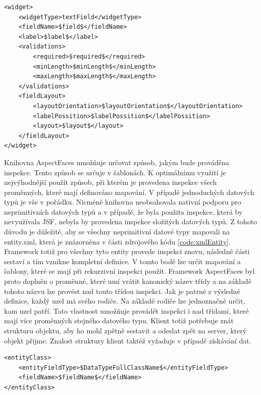 \begin{lstlisting}[caption=Ukázka definice komponenty,
label={code:xmlInputField}, basicstyle=\footnotesize]
<widget>
	<widgetType>textField</widgetType>
	<fieldName>$field$</fieldName>
	<label>$label$</label>
	<validations>
		<required>$required$</required>
		<minLength>$minLength$</minLength>
		<maxLength>$maxLength$</maxLength>
	</validations>
	<fieldLayout>
		<layoutOrientation>$layoutOrientation$</layoutOrientation>
		<labelPossition>$labelPossition$</labelPossition>
		<layout>$layout$</layout>
	</fieldLayout>
</widget>
\end{lstlisting}
Knihovna AspectFaces umožňuje určovat způsob, jakým bude prováděna inspekce. Tento způsob se určuje v šablonách. K optimálnímu využití je nejvýhodnější použít způsob, při kterém je provedena inspekce všech proměnných, které mají definováno mapování. V případě jednoduchých datových typů je vše v pořádku. Nicméně knihovna neobsahovala nativní podporu pro neprimitivních datových typů a v případě, že byla použita inspekce, která by nevyužívala JSF, nebyla by provedena inspekce složitých datových typů. Z tohoto důvodu je důležité, aby se všechny neprimitivní datové typy mapovali na entity.xml, která je znázorněna v části zdrojového kódu \ref{code:xmlEntity}. Framework totiž pro všechny tyto entity provede inspekci znovu, následně části sestaví a tím vznikne kompletní definice. V tomto bodě lze určit mapování a šablony, které se mají při rekurzivní inspekci použít. Framework AspectFaces byl proto doplněn o proměnné, které umí vrátit kanonický název třídy a na základě tohoto názvu lze provést nad touto třídou inspekci. Jak je patrné z výsledné definice, každý uzel má svého rodiče. Na základě rodiče lze jednoznačně určit, kam uzel patří. Tato vlastnost umožňuje provádět inspekci i nad třídami, které mají více proměnných stejného datového typu. Klient totiž potřebuje znát strukturu objektu, aby ho mohl zpětně sestavit a odeslat zpět na server, který objekt přijme. Znalost struktury klient taktéž vyžaduje v případě získávání dat.
\begin{lstlisting}[caption=Ukázka definice neprimitivního datového typu,
label={code:xmlEntity}]
<entityClass>
	<entityFieldType>$DataTypeFullClassName$</entityFieldType>
	<fieldName>$fieldName$</fieldName>
</entityClass>
\end{lstlisting}
